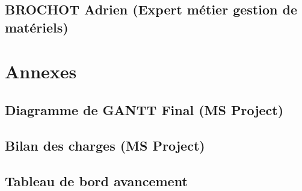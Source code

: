        \subsection{BROCHOT Adrien (Expert métier gestion de matériels)}


\section{Annexes}

       \subsection{Diagramme de GANTT Final (MS Project)}

       \subsection{Bilan des charges (MS Project)}

       \subsection{Tableau de bord avancement}





